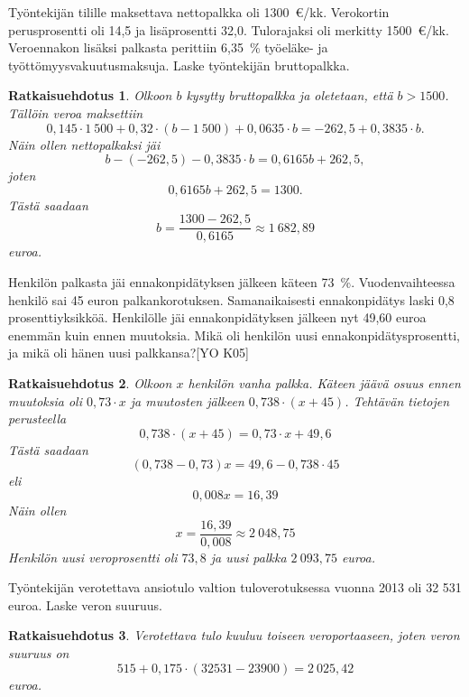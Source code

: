 \documentclass[a4paper,10pt]{article}\usepackage[]{graphicx}\usepackage[]{color}
\newtheorem*{ratk}{Ratkaisuehdotus}
\begin{document}
\begin{teht}
Työntekijän tilille maksettava nettopalkka oli 1300~\euro/kk. Verokortin perusprosentti oli 14,5 ja lisäprosentti 32,0. Tulorajaksi oli merkitty 1500~\euro/kk. Veroennakon lisäksi palkasta perittiin 6,35~\% työeläke- ja työttömyysvakuutusmaksuja. Laske työntekijän bruttopalkka.
\end{teht}
\begin{ratk}

Olkoon \(b\) kysytty bruttopalkka ja oletetaan, että \(b > 1500\). Tällöin veroa maksettiin
\[
	0{,}145\cdot1~500 + 0{,}32\cdot(b - 1~500)  + 0{,}0635\cdot b = -262{,}5 + 0{,}3835\cdot b.
\]
Näin ollen nettopalkaksi jäi
\[
	b - (-262{,}5) - 0{,}3835\cdot b = 0{,}6165b+262{,}5,
\]
joten 
\[
	0{,}6165b + 262{,}5 = 1300.
\]
Tästä saadaan 
\[
	b = \frac{1300-262{,}5}{0{,}6165} \approx 1~682{,}89
\]
euroa. 
	
\end{ratk}

\begin{teht} Henkilön palkasta jäi ennakonpidätyksen jälkeen käteen 73~\%. Vuodenvaihteessa henkilö sai 45 euron palkankorotuksen. Samanaikaisesti ennakonpidätys laski 0,8 prosenttiyksikköä. Henkilölle jäi ennakonpidätyksen jälkeen nyt 49,60 euroa enemmän kuin ennen muutoksia.
Mikä oli henkilön uusi ennakonpidätysprosentti, ja mikä oli hänen uusi palkkansa?[YO K05]
\end{teht}
\begin{ratk}

Olkoon \(x\) henkilön vanha palkka. Käteen jäävä osuus ennen muutoksia oli \(0{,}73\cdot x\) ja muutosten jälkeen \(0{,}738\cdot (x + 45)\). Tehtävän tietojen perusteella
\[
	0{,}738\cdot(x+45) = 0{,}73\cdot x + 49{,}6
\]
Tästä saadaan
\[
	(0{,}738 - 0{,}73)x = 49{,}6-0{,}738\cdot45
\]
eli
\[
	0{,}008x = 16{,}39
\]
Näin ollen 
\[
	x = \frac{16{,}39}{0{,}008} \approx 2~048{,}75
\]
Henkilön uusi veroprosentti oli \(73{,}8\) ja uusi palkka \(2~093{,}75\) euroa.
\end{ratk}

\begin{teht} Työntekijän verotettava ansiotulo valtion tuloverotuksessa vuonna 2013 oli 32 531 euroa. Laske veron suuruus.
\end{teht}
\begin{ratk}

Verotettava tulo kuuluu toiseen veroportaaseen, joten veron suuruus on 
\[
	515 + 0,175\cdot(32531-23900) = 2~025{,}42
\]
euroa.
\end{ratk}
\end{document}
